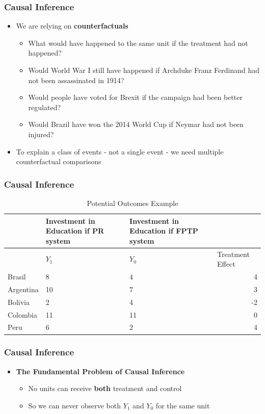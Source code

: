 \documentclass[xcolor=x11names,compress]{beamer}\usepackage[]{graphicx}\usepackage[]{color}
\renewcommand{\(}{\begin{columns}}
\renewcommand{\)}{\end{columns}}
\newcommand{\<}[1]{\begin{column}{#1}}
\renewcommand{\>}{\end{column}}
\begin{document}
\begin{frame}
\frametitle{Causal Inference}
\begin{itemize}
\item We are relying on \textbf{counterfactuals}
\begin{itemize}
\item What would have happened to the same unit if the treatment had not happened?
\item Would World War I still have happened if Archduke Franz Ferdinand had not been assassinated in 1914?
\item Would people have voted for Brexit if the campaign had been better regulated? 
\item Would Brazil have won the 2014 World Cup if Neymar had not been injured?
\end{itemize}
\item To explain a class of events - not a single event - we need multiple counterfactual comparisons
\end{itemize}
\end{frame}

\begin{frame}
\frametitle{Causal Inference}
\begin{table}[htbp]
  \centering
  \caption{Potential Outcomes Example}
    \begin{tabular}{|l|p{2.4cm}|p{2.4cm}|r|}
    \hline
          & \multicolumn{1}{p{2.4cm}|}{Investment in Education if PR system} & \multicolumn{1}{p{2.4cm}|}{Investment in Education if FPTP system} &  \bigstrut\\
    \hline
          & \multicolumn{1}{l|}{$Y_1$} & \multicolumn{1}{l|}{$Y_0$} & \multicolumn{1}{l|}{Treatment Effect} \bigstrut\\
    \hline
    Brasil & 8     & 4     & 4 \bigstrut\\
    \hline
    Argentina & 10    & 7     & 3 \bigstrut\\
    \hline
    Bolivia & 2     & 4     & -2 \bigstrut\\
    \hline
    Colombia & 11    & 11    & 0 \bigstrut\\
    \hline
    Peru & 6     & 2     & 4 \bigstrut\\
    \hline
    \end{tabular}%
  \label{tab:addlabel}%
\end{table}%
\end{frame}

\begin{frame}
\frametitle{Causal Inference}
\begin{itemize}
\item \textbf{The Fundamental Problem of Causal Inference}
\begin{itemize}
\item No units can receive \textbf{both} treatment and control
\item So we can never observe both $Y_1$ and $Y_0$ for the same unit
\end{itemize}
\end{itemize}
\end{frame}
\end{document}
